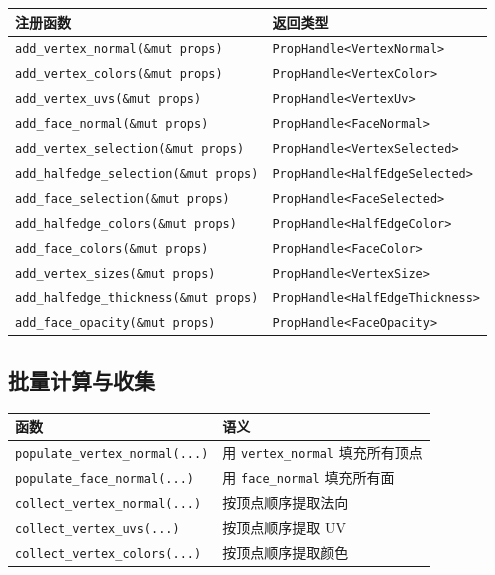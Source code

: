 \documentclass[11pt,a4paper]{article}
\begin{document}
\begin{center}
\renewcommand{\arraystretch}{1.18}
\begin{tabular}{@{}ll@{}}
  \toprule
  \textbf{注册函数} & \textbf{返回类型} \\
  \midrule
  \texttt{add\_vertex\_normal(\&mut props)}    & \texttt{PropHandle<VertexNormal>} \\
  \texttt{add\_vertex\_colors(\&mut props)}    & \texttt{PropHandle<VertexColor>} \\
  \texttt{add\_vertex\_uvs(\&mut props)}       & \texttt{PropHandle<VertexUv>} \\
  \texttt{add\_face\_normal(\&mut props)}      & \texttt{PropHandle<FaceNormal>} \\
  \texttt{add\_vertex\_selection(\&mut props)}  & \texttt{PropHandle<VertexSelected>} \\
  \texttt{add\_halfedge\_selection(\&mut props)} & \texttt{PropHandle<HalfEdgeSelected>} \\
  \texttt{add\_face\_selection(\&mut props)}    & \texttt{PropHandle<FaceSelected>} \\
  \texttt{add\_halfedge\_colors(\&mut props)}   & \texttt{PropHandle<HalfEdgeColor>} \\
  \texttt{add\_face\_colors(\&mut props)}       & \texttt{PropHandle<FaceColor>} \\
  \texttt{add\_vertex\_sizes(\&mut props)}       & \texttt{PropHandle<VertexSize>} \\
  \texttt{add\_halfedge\_thickness(\&mut props)} & \texttt{PropHandle<HalfEdgeThickness>} \\
  \texttt{add\_face\_opacity(\&mut props)}      & \texttt{PropHandle<FaceOpacity>} \\
  \bottomrule
\end{tabular}
\end{center}

\subsection{批量计算与收集}

\begin{center}
\renewcommand{\arraystretch}{1.18}
\begin{tabular}{@{}ll@{}}
  \toprule
  \textbf{函数} & \textbf{语义} \\
  \midrule
  \texttt{populate\_vertex\_normal(...)} & 用 \texttt{vertex\_normal} 填充所有顶点 \\
  \texttt{populate\_face\_normal(...)}   & 用 \texttt{face\_normal} 填充所有面 \\
  \texttt{collect\_vertex\_normal(...)}  & 按顶点顺序提取法向 \\
  \texttt{collect\_vertex\_uvs(...)}     & 按顶点顺序提取 UV \\
  \texttt{collect\_vertex\_colors(...)}  & 按顶点顺序提取颜色 \\
  \bottomrule
\end{tabular}
\end{center}
\end{document}
